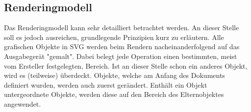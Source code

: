  
\subsection{Renderingmodell}
Das Renderingmodell kann sehr detailliert betrachtet werden. An dieser Stelle soll es jedoch ausreichen, grundlegende Prinzipien kurz zu erläutern.
Alle grafischen Objekte in SVG werden beim Rendern nacheinanderfolgend auf das Ausgabegerät "gemalt". Dabei belegt jede Operation einen bestimmten, meist vom Ersteller festgelegten, Bereich. Ist an dieser Stelle schon ein anderes Objekt, wird es (teilweise) überdeckt.
Objekte, welche am Anfang des Dokuments definiert wurden, werden auch zuerst gerändert. Enthält ein Objekt untergeordnete Objekte, werden diese auf den Bereich des Elternobjektes angewendet.

\newpage
